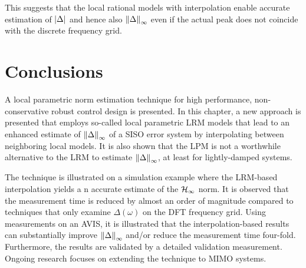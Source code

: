 This suggests that the local rational models with interpolation enable accurate estimation of  $\left| \Delta \right|$ and hence also $\left\| \Delta \right\|_{\infty}$ even if the actual peak does not coincide with the discrete frequency grid.

\section{Conclusions}
\label{sec:lrmhinf:conclusion}
A local parametric \Hinf{} norm estimation technique for high performance, non-conservative robust control design is presented.
In this chapter, a new approach is presented that employs so-called local parametric \gls{LRM} models that lead to an enhanced estimate of $\left\| \Delta \right\|_{\infty}$ of a \gls{SISO} error system by interpolating between neighboring local models.
It is also shown that the \gls{LPM} is not a worthwhile alternative to the \gls{LRM} to estimate $\left\| \Delta \right\|_{\infty}$, at least for lightly-damped systems.

The technique is illustrated on a simulation example where the \gls{LRM}-based interpolation yields a n accurate estimate of the $\mathcal{H}_{\infty}{}$ norm.
It is observed that the measurement time is reduced by almost an order of magnitude compared to techniques that only examine $\Delta(\omega)$ on the \gls{DFT} frequency grid.
Using measurements on an \gls{AVIS}, it is illustrated that the interpolation-based results can substantially improve $\left\| \Delta \right\|_{\infty}$ and/or reduce the measurement time four-fold.
Furthermore, the results are validated by a detailed validation measurement.
Ongoing research focuses on extending the technique to \gls{MIMO} systems.



\begin{subappendices}
  
\end{subappendices}
